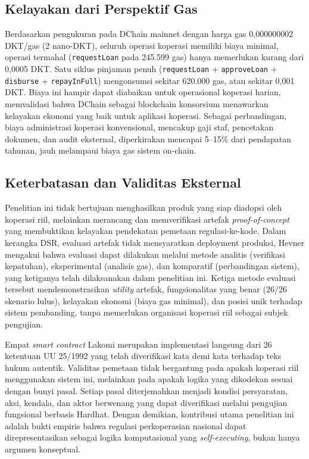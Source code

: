 \subsection{Kelayakan dari Perspektif Gas}

Berdasarkan pengukuran pada DChain mainnet dengan harga gas 0,000000002 DKT/gas (2 nano-DKT), seluruh operasi koperasi memiliki biaya minimal, operasi termahal (\texttt{requestLoan} pada 245.599 gas) hanya memerlukan kurang dari 0,0005 DKT. Satu siklus pinjaman penuh (\texttt{requestLoan} + \texttt{approveLoan} + \texttt{disburse} + \texttt{repayInFull}) mengonsumsi sekitar 620.000 gas, atau sekitar 0,001 DKT. Biaya ini hampir dapat diabaikan untuk operasional koperasi harian, memvalidasi bahwa DChain sebagai blockchain konsorsium menawarkan kelayakan ekonomi yang baik untuk aplikasi koperasi. Sebagai perbandingan, biaya administrasi koperasi konvensional, mencakup gaji staf, pencetakan dokumen, dan audit eksternal, diperkirakan mencapai 5--15\% dari pendapatan tahunan, jauh melampaui biaya gas sistem on-chain.

\subsection{Keterbatasan dan Validitas Eksternal}

Penelitian ini tidak bertujuan menghasilkan produk yang siap diadopsi oleh koperasi riil, melainkan merancang dan memverifikasi artefak \textit{proof-of-concept} yang membuktikan kelayakan pendekatan pemetaan regulasi-ke-kode. Dalam kerangka DSR, evaluasi artefak tidak mensyaratkan deployment produksi, Hevner \cite{hevner2004design} mengakui bahwa evaluasi dapat dilakukan melalui metode analitis (verifikasi kepatuhan), eksperimental (analisis gas), dan komparatif (perbandingan sistem), yang ketiganya telah dilaksanakan dalam penelitian ini. Ketiga metode evaluasi tersebut mendemonstrasikan \textit{utility} artefak, fungsionalitas yang benar (26/26 skenario lulus), kelayakan ekonomi (biaya gas minimal), dan posisi unik terhadap sistem pembanding, tanpa memerlukan organisasi koperasi riil sebagai subjek pengujian.

Empat \textit{smart contract} Lakomi merupakan implementasi langsung dari 26 ketentuan UU 25/1992 yang telah diverifikasi kata demi kata terhadap teks hukum autentik. Validitas pemetaan tidak bergantung pada apakah koperasi riil menggunakan sistem ini, melainkan pada apakah logika yang dikodekan sesuai dengan bunyi pasal. Setiap pasal diterjemahkan menjadi kondisi persyaratan, aksi, kendala, dan aktor berwenang yang dapat diverifikasi melalui pengujian fungsional berbasis Hardhat. Dengan demikian, kontribusi utama penelitian ini adalah bukti empiris bahwa regulasi perkoperasian nasional dapat direpresentasikan sebagai logika komputasional yang \textit{self-executing}, bukan hanya argumen konseptual.

